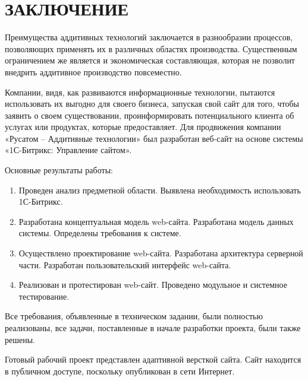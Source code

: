 \section*{ЗАКЛЮЧЕНИЕ}

Преимущества аддитивных технологий заключается в разнообразии процессов, позволяющих применять их в различных областях производства. Существенным ограничением же является и экономическая составляющая, которая не позволит внедрить аддитивное производство повсеместно.
  
Компании, видя, как развиваются информационные технологии, пытаются использовать их выгодно для своего бизнеса, запуская свой сайт для того, чтобы заявить о своем существовании, проинформировать потенциального клиента об услугах или продуктах, которые предоставляет. 
Для продвижения компании «Русатом – Аддитивные технологии» был разработан веб-сайт на основе системы «1С-Битрикс: Управление сайтом».

Основные результаты работы:

\begin{enumerate}
\item Проведен анализ предметной области. Выявлена необходимость использовать 1С-Битрикс.
\item Разработана концептуальная модель web-сайта. Разработана модель данных системы. Определены требования к системе.
\item Осуществлено проектирование web-сайта. Разработана архитектура серверной части. Разработан пользовательский интерфейс web-сайта.
\item Реализован и протестирован web-сайт. Проведено модульное и системное тестирование.
\end{enumerate}

Все требования, объявленные в техническом задании, были полностью реализованы, все задачи, поставленные в начале разработки проекта, были также решены.

Готовый рабочий проект представлен адаптивной версткой сайта. Сайт находится в публичном доступе, поскольку опубликован в сети Интернет.  
